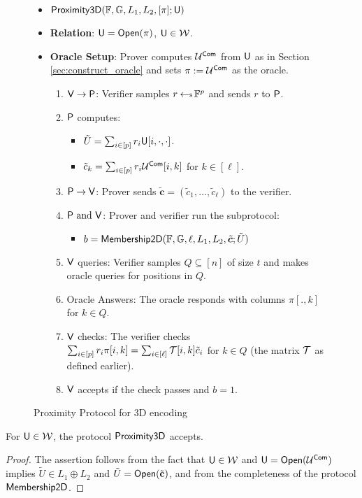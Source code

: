 \begin{figure}[h!]
\begin{framed}
\begin{itemize}
\item {$\mathsf{Proximity3D}(\mathbb{F},\mathbb{G},L_1,L_2,[\pi];\mathsf{U})$}
\item {\bf Relation}: $\mathsf{U}=\mathsf{Open}(\pi)$, $\mathsf{U}\in \mathcal{W}$.
\item {\bf Oracle Setup}: Prover computes $\mathcal{U}^{\mathsf{Com}}$ from $\mathsf{U}$ as in
Section \ref{sec:construct_oracle} and sets
$\pi := \mathcal{U}^{\mathsf{Com}}$ as the oracle.
\begin{enumerate}[{1.}]
\item $\mathsf{V}\rightarrow \mathsf{P}$: Verifier samples $r\hskip2.3pt{\gets\!\!\mbox{\tiny${\$}$\normalsize}}\, \mathbb{F}^p$ and
sends $r$ to $\mathsf{P}$.
\item $\mathsf{P}$ computes: 
	\begin{itemize}
	\item $\tilde{U}=\sum_{i\in [p]}r_i\mathsf{U}[i,\cdot,\cdot]$.
	\item $\tilde{c}_k = \sum_{i\in [p]}r_i\mathcal{U}^{\mathsf{Com}}[i,k]$ for $k\in [\ell]$.
	\end{itemize}
\item $\mathsf{P}\rightarrow \mathsf{V}$: Prover sends
$\tilde{\bm{c}}=(\tilde{c}_1,\ldots,\tilde{c}_\ell)$ to the verifier.
\item $\mathsf{P} \text{ and } \mathsf{V}$: Prover and verifier run the subprotocol:
	\begin{itemize}
	\item $b=\mathsf{Membership2D}(\mathbb{F},\mathbb{G},\ell,L_1,L_2,\tilde{\bm{c}};\tilde{U})$
	\end{itemize}
\item $\mathsf{V}$ queries: Verifier samples $Q\subseteq [n]$ of size
$t$ and makes oracle queries for positions in $Q$.
\item Oracle Answers: The oracle responds with columns $\pi[.,k]$ for
$k\in Q$.
\item $\mathsf{V}$ checks: The verifier checks $\sum_{i\in
[p]}r_i\pi[i,k]=\sum_{i\in [\ell]}\mathcal{T}[i,k]\tilde{c}_i$ for $k\in Q$ (the matrix $\mathcal{T}$ as defined earlier).
\item $\mathsf{V}$ accepts if the check passes and $b=1$.
\end{enumerate}
\end{itemize}
\end{framed}
\caption{Proximity Protocol for 3D encoding}
\label{fig:prox3d}
\end{figure}

\begin{lemma}[Completeness]\label{lem:proximity3d_complete}
For $\mathsf{U}\in\mathcal{W}$, the protocol $\mathsf{Proximity3D}$ accepts.
\end{lemma}
\begin{proof}
The assertion follows from the fact that $\mathsf{U}\in \mathcal{W}$ and
$\mathsf{U}=\mathsf{Open}(\mathcal{U}^{\mathsf{Com}})$ implies $\tilde{U}\in L_1\oplus L_2$ and
$\tilde{U}=\mathsf{Open}(\tilde{\mathbf{c}})$, and from the completeness of the protocol
$\mathsf{Membership2D}$.
\end{proof}

